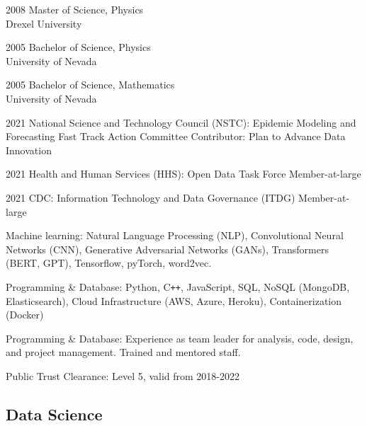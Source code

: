 \documentclass[]{scrartcl}
\begin{document}
\begin{cleanCV}
\WorkExperience
{2008}
{Master of Science, Physics}
{\\Drexel University}

\WorkExperience
{2005}
{Bachelor of Science, Physics}
{\\University of Nevada}

\WorkExperience
{2005}
{Bachelor of Science, Mathematics}
{\\University of Nevada}


\WorkExperienceX
{2021}
{National Science and Technology Council (NSTC): Epidemic Modeling and Forecasting Fast Track Action Committee}
{Contributor: Plan to Advance Data Innovation}

\WorkExperienceX
{2021}
{Health and Human Services (HHS): Open Data Task Force}
{Member-at-large}

\WorkExperienceX
{2021}
{CDC: Information Technology and Data Governance (ITDG)}
{Member-at-large}



\WorkExperience
{ }
{Machine learning: }
{Natural Language Processing (NLP), Convolutional Neural Networks (CNN), Generative Adversarial Networks (GANs), Transformers (BERT, GPT), Tensorflow, pyTorch, word2vec.}

\WorkExperience
{ }
{Programming \& Database: }
{Python, C\texttt{++}, JavaScript, SQL, NoSQL (MongoDB, Elasticsearch), Cloud Infrastructure (AWS, Azure, Heroku), Containerization (Docker)}

\WorkExperience
{ }
{Programming \& Database: }
{Experience as team leader for analysis, code, design, and project management. Trained and mentored staff.}

\WorkExperience
{ }
{Public Trust Clearance: }
{Level 5, valid from 2018-2022}



\vspace{-1em}

\subsection{Data Science}


\end{cleanCV}
\end{document}

